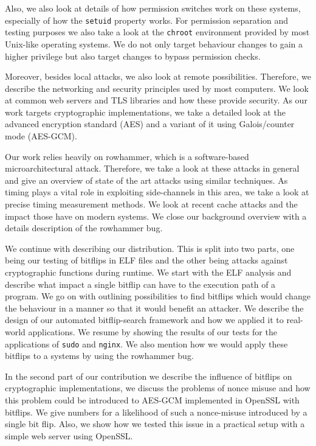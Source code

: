Also, we also look at details of how permission switches work on these systems,
especially of how the \texttt{setuid} property works. For permission separation
and testing purposes we also take a look at the \texttt{chroot}
environment provided by most Unix-like operating systems. We do not only target
behaviour changes to gain a higher privilege but also target changes to bypass
permission checks.

Moreover, besides local attacks, we also look at remote possibilities.
Therefore, we describe the networking and security principles used by most
computers. We look at common web servers and TLS libraries and how these
provide security. As our work targets cryptographic implementations, we take a
detailed look at the advanced encryption standard (AES) and a variant of it
using Galois/counter mode (AES-GCM).

Our work relies heavily on rowhammer, which is a software-based
microarchitectural attack. Therefore, we take a look at these attacks in general
and give an overview of state of the art attacks using similar techniques. As
timing plays a vital role in exploiting side-channels in this area, we take a
look at precise timing measurement methods. We look at recent cache attacks and
the impact those have on modern systems. We close our background overview with a
details description of the rowhammer bug.

We continue with describing our distribution. This is split into two parts, one
being our testing of bitflips in ELF files and the other being attacks against
cryptographic functions during runtime. We start with the ELF analysis and
describe what impact a single bitflip can have to the execution path of a
program. We go on with outlining possibilities to find bitflips which would
change the behaviour in a manner so that it would benefit an attacker. We
describe the design of our automated bitflip-search framework and how we applied
it to real-world applications. We resume by showing the results of our tests for
the applications of \texttt{sudo} and \texttt{nginx}. We also mention how we
would apply these bitflips to a systems by using the rowhammer bug.

In the second part of our contribution we describe the influence of bitflips on
cryptographic implementations, we discuss the problems of nonce misuse and how
this problem could be introduced to AES-GCM implemented in OpenSSL with
bitflips. We give numbers for a likelihood of such a nonce-misuse introduced by
a single bit flip. Also, we show how we tested this issue in a practical setup
with a simple web server using OpenSSL.

